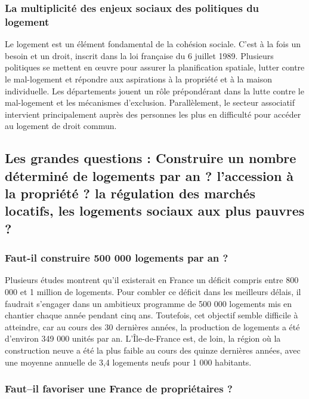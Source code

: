 \documentclass[a4paper, 12pt]{report}
\begin{document}
\subsubsection{La multiplicité des enjeux sociaux des politiques du logement}

Le logement est un élément fondamental de la cohésion sociale. C'est à la fois un besoin et un droit, inscrit dans la loi française du 6 juillet 1989. Plusieurs politiques se mettent en œuvre pour assurer la planification spatiale, lutter contre le mal-logement et répondre aux aspirations à la propriété et à la maison individuelle. Les départements jouent un rôle prépondérant dans la lutte contre le mal-logement et les mécanismes d’exclusion. Parallèlement, le secteur associatif intervient principalement auprès des personnes les plus en difficulté pour accéder au logement de droit commun.

\subsection{Les grandes questions : Construire un nombre déterminé de logements par an ? l’accession à la propriété ? la régulation des marchés locatifs, les logements sociaux aux plus pauvres ?}

\subsubsection{Faut-il construire 500 000 logements par an ?}

Plusieurs études montrent qu’il existerait en France un déficit compris entre 800 000 et 1 million de logements. Pour combler ce déficit dans les meilleurs délais, il faudrait s’engager dans un ambitieux programme de 500 000 logements mis en chantier chaque année pendant cinq ans. Toutefois, cet objectif semble difficile à atteindre, car au cours des 30 dernières années, la production de logements a été d'environ 349 000 unités par an. L’Île-de-France est, de loin, la région où la construction neuve a été la plus faible au cours des quinze dernières années, avec une moyenne annuelle de 3,4 logements neufs pour 1 000 habitants.

\subsubsection{Faut–il favoriser une France de propriétaires ?}
\end{document}
